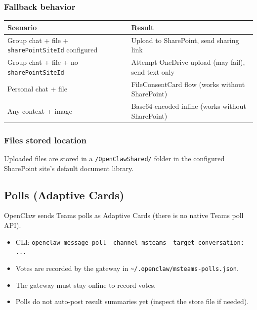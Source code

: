 \subsubsection{Fallback behavior}



\begin{table}[h]
\centering
\small
\begin{tabular}{|l|l|}
\hline
Scenario & Result \\
\hline
Group chat + file + \texttt{sharePointSiteId} configured & Upload to SharePoint, send sharing link \\
\hline
Group chat + file + no \texttt{sharePointSiteId} & Attempt OneDrive upload (may fail), send text only \\
\hline
Personal chat + file & FileConsentCard flow (works without SharePoint) \\
\hline
Any context + image & Base64-encoded inline (works without SharePoint) \\
\hline
\end{tabular}
\end{table}



\subsubsection{Files stored location}


Uploaded files are stored in a \texttt{/OpenClawShared/} folder in the configured SharePoint site's default document library.

\subsection{Polls (Adaptive Cards)}


OpenClaw sends Teams polls as Adaptive Cards (there is no native Teams poll API).

\begin{itemize}
  \item CLI: \texttt{openclaw message poll --channel msteams --target conversation: ...}
  \item Votes are recorded by the gateway in \texttt{\textasciitilde{}/.openclaw/msteams-polls.json}.
  \item The gateway must stay online to record votes.
  \item Polls do not auto-post result summaries yet (inspect the store file if needed).
\end{itemize}


